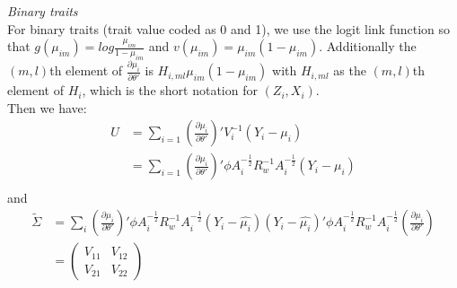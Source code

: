 \documentclass[12pt]{article}
\begin{document}
\textit{Binary traits}\\
\indent For binary traits (trait value coded as 0 and 1), we use the logit link function so that $g(\mu_{im}) = log \frac{\mu_{im}}{1 - \mu_{im}}$ and $v(\mu_{im}) = \mu_{im} (1 - \mu_{im})$. Additionally the $(m, l)$th element of $\frac{\partial\mu_{i}}{\partial\theta'}$ is
$
H_{i,ml} \mu_{im} (1- \mu_{im})
$
with $H_{i,ml}$ as the $(m, l)$th element of $H_i$, which is the short notation for $(Z_{i},X_{i})$.\\
Then we have:
\begin{align*}
U & = \sum_{i=1} (\frac{\partial\mu_{i}}{\partial\theta'})' V_i^{-1} (Y_{i}-\mu_{i})\\
& = \sum_{i=1} (\frac{\partial\mu_{i}}{\partial\theta'})' \phi A_{i}^{-\frac{1}{2}} R_{w}^{-1} A_{i}^{-\frac{1}{2}} (Y_{i}-\mu_{i})\\
\end{align*}
and
\begin{align*}
\widetilde{\Sigma} & = \sum_{i}\left(\frac{\partial\mu_{i}}{\partial\theta'}\right)' \phi A_{i}^{-\frac{1}{2}} R_{w}^{-1} A_{i}^{-\frac{1}{2}} (Y_{i}-\hat{\mu_{i}}) (Y_{i}-\hat{\mu_{i}})' \phi A_{i}^{-\frac{1}{2}} R_{w}^{-1} A_{i}^{-\frac{1}{2}} \left( \frac{\partial\mu_{i}}{\partial\theta'} \right)\\
& = 
\begin{pmatrix}
V_{11} & V_{12}\\
 V_{21} & V_{22}
\end{pmatrix}
\end{align*}
\end{document}
